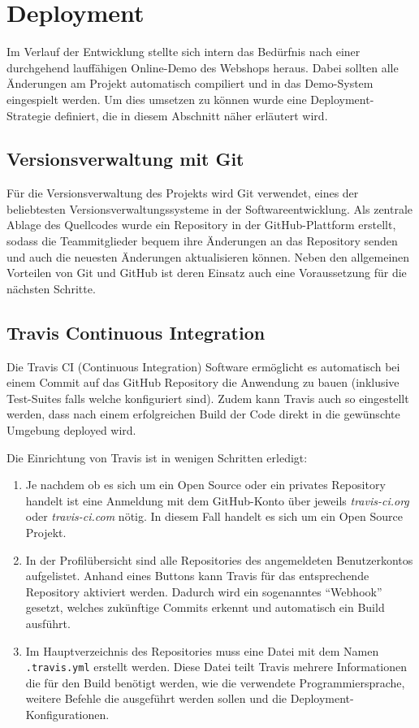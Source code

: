 \section{Deployment} \thispagestyle{nomarkstyle}
Im Verlauf der Entwicklung stellte sich intern das Bedürfnis nach einer durchgehend lauffähigen Online-Demo des Webshops heraus. Dabei sollten alle Änderungen am Projekt automatisch compiliert und in das Demo-System eingespielt werden. Um dies umsetzen zu können wurde eine Deployment-Strategie definiert, die in diesem Abschnitt näher erläutert wird.

\subsection{Versionsverwaltung mit Git}
Für die Versionsverwaltung des Projekts wird Git verwendet, eines der beliebtesten Versionsverwaltungssysteme in der Softwareentwicklung. Als zentrale Ablage des Quellcodes wurde ein Repository in der GitHub-Plattform erstellt, sodass die Teammitglieder bequem ihre Änderungen an das Repository senden und auch die neuesten Änderungen aktualisieren können\cite{Coutermarsh2014}. Neben den allgemeinen Vorteilen von Git und GitHub ist deren Einsatz auch eine Voraussetzung für die nächsten Schritte.

\subsection{Travis Continuous Integration}
Die Travis CI (Continuous Integration) Software ermöglicht es automatisch bei einem Commit auf das GitHub Repository die Anwendung zu bauen (inklusive Test-Suites falls welche konfiguriert sind). Zudem kann Travis auch so eingestellt werden, dass nach einem erfolgreichen Build der Code direkt in die gewünschte Umgebung deployed wird\cite{Coutermarsh2014}.

Die Einrichtung von Travis ist in wenigen Schritten erledigt:

\begin{enumerate}
	\item Je nachdem ob es sich um ein Open Source oder ein privates Repository handelt ist eine Anmeldung mit dem GitHub-Konto über jeweils \textit{travis-ci.org} oder \textit{travis-ci.com} nötig. In diesem Fall handelt es sich um ein Open Source Projekt.
	\item In der Profilübersicht sind alle Repositories des angemeldeten Benutzerkontos aufgelistet. Anhand eines Buttons kann Travis für das entsprechende Repository aktiviert werden. Dadurch wird ein sogenanntes \enquote{Webhook} gesetzt, welches zukünftige Commits erkennt und automatisch ein Build ausführt.
	\item Im Hauptverzeichnis des Repositories muss eine Datei mit dem Namen \texttt{.travis.yml} erstellt werden. Diese Datei teilt Travis mehrere Informationen die für den Build benötigt werden, wie die verwendete Programmiersprache, weitere Befehle die ausgeführt werden sollen und die Deployment-Konfigurationen.
\end{enumerate}

